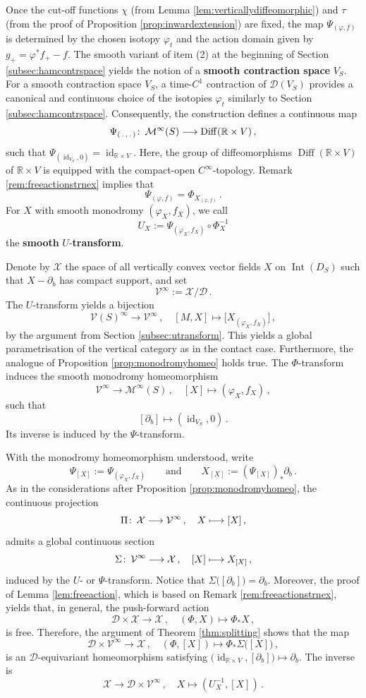 \documentclass{amsart}
\theoremstyle{definition}
\def\co{\colon\thinspace}
\newcommand{\DD}{\mathcal D}
\newcommand{\MM}{\mathcal M}
\newcommand{\R}{\mathbb R}
\newcommand{\VV}{\mathcal V}
\newcommand{\XX}{\mathcal X}
\newcommand{\lra}{\longrightarrow}
\DeclareMathOperator{\Diff}{\mathrm{Diff}}
\DeclareMathOperator{\id}{\mathrm{id}}
\DeclareMathOperator{\Int}{\mathrm{Int}}
\begin{document}
Once the cut-off functions $\chi$
(from Lemma \ref{lem:verticallydiffeomorphic})
and
$\tau$
(from the proof of Proposition \ref{prop:inwardextension})
are fixed,
the map $\Psi_{(\varphi,f)}$ is determined by
the chosen isotopy $\varphi_t$ and the action domain
given by $g_+=\varphi^*f_+-f$.
The smooth variant of item (2) at the beginning of
Section \ref{subsec:hamcontrspace} 
yields the notion of a {\bf smooth contraction space} $V_S$.
For a smooth contraction space $V_S$,
a time-$C^1$ contraction of $\DD(V_S)$
provides a canonical and continuous choice
of the isotopies $\varphi_t$ similarly to
Section \ref{subsec:hamcontrspace}.
Consequently, the construction defines a continuous map
\[
\Psi_{(\,.\,,\,.\,)}
\co
\MM^{\infty}(S)
\lra
\Diff(\R\times V)
\,,
\]
such that $\Psi_{(\id_{V_S},0)}=\id_{\R\times V}$.
Here, the group of diffeomorphisms
$\Diff(\R\times V)$ of $\R\times V$
is equipped with the compact-open
$C^\infty$-topology.
Remark \ref{rem:freeactionstrnex} implies that
\[
\Psi_{(\varphi,f)}
=
\Phi_{X_{(\varphi,f)}}
\,.
\]
For $X$ with smooth monodromy $(\varphi_X,f_X)$,
we call
\[
U_X
:=
\Psi_{(\varphi_X,f_X)}\circ\Phi_X^{-1}
\]
the {\bf smooth} $U$-{\bf transform}.

Denote by $\XX$
the space of all vertically convex vector fields $X$
on $\Int(D_S)$ such that $X-\partial_b$
has compact support, and set
\[
\VV^{\infty}:=\XX/\DD
\,.
\]
The $U$-transform yields
a bijection
\[
\VV(S)^{\infty}\lra\VV^{\infty}
\,,
\quad
[M,X]\longmapsto
\big[X_{(\varphi_X,f_X)}\big]
\,,
\]
by the argument from
Section \ref{subsec:utransform}.
This yields a global parametrisation
of the vertical category as in the contact case.
Furthermore, the analogue of
Proposition \ref{prop:monodromyhomeo} holds true.
The $\Phi$-transform induces the
smooth monodromy homeomorphism
\[
\VV^{\infty}\lra\MM^{\infty}(S)
\,,
\quad
[X]\longmapsto(\varphi_X,f_X)
\,,
\]
such that
\[
[\partial_b]\longmapsto(\id_{V_S},0)
\,.
\]
Its inverse is induced by the $\Psi$-transform.

With the monodromy homeomorphism understood,
write
\[
\Psi_{[X]}:=\Psi_{(\varphi_X,f_X)}
\qquad\text{and}\qquad
X_{[X]}:=(\Psi_{[X]})_*\partial_b
\,.
\]
As in the considerations after
Proposition \ref{prop:monodromyhomeo},
the continuous projection
  \[
  \Pi\co
  \XX\lra\VV^{\infty}
  \,,
  \quad
  X\longmapsto[X]
  \,,
  \]
admits a global continuous section
  \[
  \Sigma\co
  \VV^{\infty}\lra\XX
  \,,
  \quad
  [X]\longmapsto X_{[X]}
  \,,
  \]
induced by the $U$- or $\Psi$-transform.
Notice that $\Sigma\big([\partial_b]\big)=\partial_b$.
Moreover,
the proof of Lemma \ref{lem:freeaction},
which is based on Remark \ref{rem:freeactionstrnex},
yields that, in general, the push-forward action
  \[
  \DD\times\XX\lra\XX
  \,,
  \quad
  (\Phi,X)\longmapsto\Phi_*X
  \,,
  \]
is free.
Therefore, the argument of
Theorem \ref{thm:splitting}
shows that the map
  \[
  \DD\times\VV^{\infty}\lra\XX
  \,,
  \quad
  (\Phi,[X])\longmapsto
  \Phi_*\Sigma\big([X]\big)
  \,,
  \]
is an $\DD$-equivariant homeomorphism satisfying
$\big(\!\id_{\R\times V},[\partial_b]\big)\mapsto\partial_b$.
The inverse is
  \[
  \XX\lra\DD\times\VV^{\infty}
  \,,
  \quad
  X\longmapsto(U_X^{-1},[X])
  \,.
  \]
  
\end{document}
